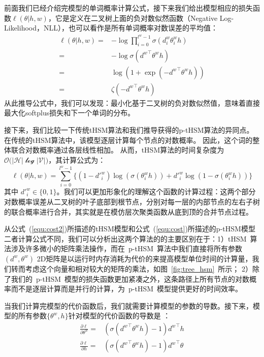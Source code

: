 前面我们已经介绍完模型的单词概率计算公式，接下来我们给出模型相应的损失函数$ \ell(\theta | h,w)$，它是定义在二叉树上面的负对数似然函数（Negative Log-Likelihood，NLL），也可以看作是所有单词概率对数误差的平均值：
\begin{equation}\label{equ:cost}
\begin{split}
   \ell(\theta|h,w) =&-\log\prod_{i=0}^{l^w -1} \sigma(d_i^w \theta_{i}^w h) \\
   =& -\log \sigma({d^w}^\top \theta^w h)\\
    =& \log (1+\exp(- {d^w}^\top \theta^w h )) \\
    =&  \zeta(- {d^w}^\top \theta^w h )
\end{split}
\end{equation}
从此推导公式中，我们可以发现：最小化基于二叉树的负对数似然值，意味着直接最大化softplus损失和下一个单词的分布。

接下来，我们比较一下传统tHSM算法和我们推导获得的p-tHSM算法的异同点。在传统的tHSM算法中，该模型逐层计算每个节点的对数概率。 因此，这个词的整体联合对数概率通过各层线性相加。 从而，tHSM算法的时间复杂度为$\mathcal{O(|H|\log|V|})$，其计算公式为：
\begin{equation}\label{equ:cost2}
\ell(\theta|h,w) =\sum_{i=0}^{l^w-1} \{(1-d'^w_i)\log (\sigma(\theta_{i}^w h))  + {d'^w_i}\log (1-\sigma (\theta_{i}^w h))\}
\end{equation}
其中 $d'^w_i\in \{0,1\}$。我们可以更加形象化的理解这个函数的计算过程：这两个部分对数概率误差从二叉树的叶子底部到根节点，分别对每一层的内部节点的左右子树的联合概率进行合并，其实就是在模仿层次聚类函数从底到顶的合并节点过程。

从公式~(\ref{equ:cost2})所描述的tHSM模型和公式~(\ref{equ:cost})所描述的p-tHSM模型二者计算公式不同，我们可以分析出这两个算法的的主要区别在于：1）tHSM~算法涉及许多微小的矩阵乘法操作，而在~p-tHSM~算法中我们直接将所有参数$(d^w,\theta^w)$ 2D矩阵是以运行时内存消耗为代价的来提高模型单位时间的计算量，我们转而考虑这个向量和相对较大的矩阵的乘法，如图~\ref{fig:tree_hsm}~所示； 2）除了我们的~p-tHSM~模型的损失函数更加紧凑之外，这条路径上所有节点的对数概率而不是逐层计算而是并行的计算，为~p-tHSM~模型提供更好的时间效率。

当我们计算完模型的代价函数后，我们就需要计算模型的参数的导数。接下来，模型的所有参数$\{\theta^w,h\}$针对模型的代价函数的导数是 ：
\begin{equation}
\begin{split}
\frac{\partial \ell}{\partial \theta^w}=&(\sigma({d^w}^\top\theta^w h) -1){d^w}^\top h \\
\frac{\partial \ell}{\partial h}=&(\sigma({d^w}^\top \theta^w h) -1){d^w}^\top \theta
\end{split}
\end{equation}


